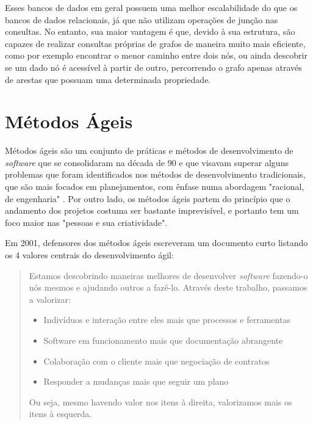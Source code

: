 
Esses bancos de dados em geral possuem uma melhor escalabilidade do que os bancos de dados relacionais, já que não utilizam operações de junção nas consultas.
No entanto, sua maior vantagem é que, devido à sua estrutura, são capazes de realizar consultas próprias de grafos de maneira muito mais eficiente, como por exemplo encontrar o menor caminho entre dois nós, ou ainda descobrir se um dado nó é acessível à partir de outro, percorrendo o grafo apenas através de arestas que possuam uma determinada propriedade.


\section{Métodos Ágeis}

Métodos ágeis são um conjunto de práticas e métodos de desenvolvimento de \emph{software} que se consolidaram na década de 90 e que visavam superar alguns problemas que foram identificados nos métodos de desenvolvimento tradicionais, que são mais focados em planejamentos, com ênfase numa abordagem "racional, de engenharia" \cite{Dyba:2008:ESA:1379905.1379989}. Por outro lado, os métodos ágeis partem do princípio que o andamento dos projetos costuma ser bastante imprevisível, e portanto tem um foco maior nas "pessoas e sua criatividade".

Em 2001, defensores dos métodos ágeis escreveram um documento curto listando os 4 valores centrais do desenvolvimento ágil:

\begin{quote}
Estamos descobrindo maneiras melhores de desenvolver \emph{software} fazendo-o nós mesmos e ajudando outros a fazê-lo. Através deste trabalho, passamos a valorizar:
\begin{itemize}

\item    Indivíduos e interação entre eles mais que processos e ferramentas
    
\item    Software em funcionamento mais que documentação abrangente
    
\item    Colaboração com o cliente mais que negociação de contratos

\item    Responder a mudanças mais que seguir um plano

\end{itemize}
Ou seja, mesmo havendo valor nos itens à direita, valorizamos mais os itens à esquerda.\cite{agilemanifesto}
\end{quote}

